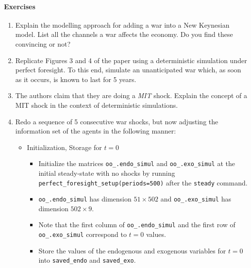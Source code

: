 \documentclass{article}
\begin{document}
\paragraph{Exercises}
\begin{enumerate}

\item Explain the modelling approach for adding a war into a New Keynesian model.
List all the channels a war affects the economy.
Do you find these convincing or not?

\item Replicate Figures 3 and 4 of the paper using a deterministic simulation under perfect foresight.
To this end, simulate an unanticipated war which, as soon as it occurs, is known to last for 5 years.

\item The authors claim that they are doing a \emph{MIT} shock.
Explain the concept of a MIT shock in the context of deterministic simulations.

\item Redo a sequence of 5 consecutive war shocks, but now adjusting the information set of the agents in the following manner:
\begin{itemize}
    \item Initialization, Storage for $t=0$
    \begin{itemize}
      \item Initialize the matrices \texttt{oo\_.endo\_simul} and \texttt{oo\_.exo\_simul} at the initial steady-state with no shocks
      by running \texttt{perfect\_foresight\_setup(periods=500)} after the \texttt{steady} command.
      \item \texttt{oo\_.endo\_simul} has dimension $51 \times 502$ and \texttt{oo\_.exo\_simul} has dimension $502 \times 9$.
      \item Note that the first column of \texttt{oo\_.endo\_simul} and the first row of \texttt{oo\_.exo\_simul} correspond to $t=0$ values.
      \item Store the values of the endogenous and exogenous variables for $t=0$ into \texttt{saved\_endo} and \texttt{saved\_exo}.
    \end{itemize}
    

\end{itemize}
\end{enumerate}
\end{document}
